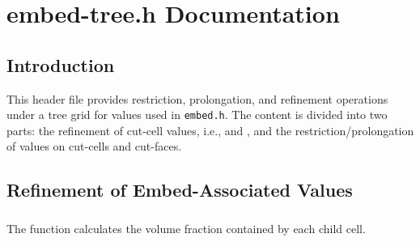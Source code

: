 \chapter{embed-tree.h Documentation}
\ifsingle
\maketitle
\fi
\chaptermeta[draft][2025-06-09]

\section{Introduction}
This header file provides restriction, prolongation, and refinement operations under a tree grid for values used in \texttt{embed.h}. The content is divided into two parts: the refinement of cut-cell values, i.e.,  and , and the restriction/prolongation of values on cut-cells and cut-faces.

\section{Refinement of Embed-Associated Values}
\subsection{}
The  function calculates the volume fraction contained by each child cell.

